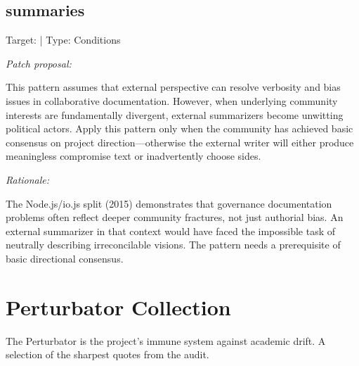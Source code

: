\documentclass[11pt,a4paper]{article}
\begin{document}
\subsection{summaries}
Target: \texttt{} | Type: Conditions

\textit{Patch proposal:}

This pattern assumes that external perspective can resolve verbosity and bias issues in collaborative documentation. However, when underlying community interests are fundamentally divergent, external summarizers become unwitting political actors. Apply this pattern only when the community has achieved basic consensus on project direction—otherwise the external writer will either produce meaningless compromise text or inadvertently choose sides.

\textit{Rationale:}

The Node.js/io.js split (2015) demonstrates that governance documentation problems often reflect deeper community fractures, not just authorial bias. An external summarizer in that context would have faced the impossible task of neutrally describing irreconcilable visions. The pattern needs a prerequisite of basic directional consensus.

\section{Perturbator Collection}
The Perturbator is the project's immune system against academic drift. A selection of the sharpest quotes from the audit.
\end{document}
